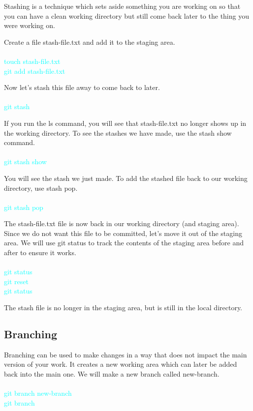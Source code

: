 \documentclass[10pt,twocolumn]{article}
\begin{document}
Stashing is a technique which sets aside something you are working on so that you can have a clean working directory but still come back later to the thing you were working on. 

Create a file stash-file.txt and add it to the staging area.\\\\
\textcolor{cyan}{
touch stash-file.txt\\
git add stash-file.txt\\
}

Now let’s stash this file away to come back to later. \\\\
\textcolor{cyan}{
git stash \\
}

If you run the ls command, you will see that stash-file.txt no longer shows up in the working directory. To see the stashes we have made, use the stash show command. \\\\
\textcolor{cyan}{
git stash show\\
}

You will see the stash we just made. To add the stashed file back to our working directory, use stash pop.\\\\
\textcolor{cyan}{
git stash pop\\
}

The stash-file.txt file is now back in our working directory (and staging area). Since we do not want this file to be committed, let’s move it out of the staging area. We will use git status to track the contents of the staging area before and after to ensure it works.\\\\
\textcolor{cyan}{
git status\\
git reset\\
git status\\
}

The stash file is no longer in the staging area, but is still in the local directory. 


\subsection{Branching}

Branching can be used to make changes in a way that does not impact the main version of your work. It creates a new working area which can later be added back into the main one. We will make a new branch called new-branch.\\\\
\textcolor{cyan}{
git branch new-branch\\
git branch\\
}
\end{document}
